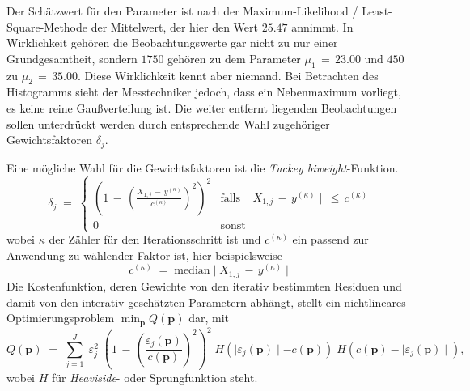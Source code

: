 Der Schätzwert für den Parameter ist nach der Maximum-Likelihood / Least-Square-Methode der
Mittelwert, der hier den Wert $25.47$ annimmt. In Wirklichkeit gehören die Beobachtungswerte gar nicht zu
nur einer Grundgesamtheit, sondern $1750$ gehören zu dem Parameter $\mu_1 \, = \, 23.00$ und $450$ zu $\mu_2 \, = \, 35.00$.
Diese Wirklichkeit kennt aber niemand. Bei Betrachten des Histogramms sieht der Messtechniker jedoch, dass ein
Nebenmaximum vorliegt, es keine reine Gaußverteilung ist. Die weiter entfernt liegenden Beobachtungen sollen unterdrückt werden
durch entsprechende Wahl zugehöriger Gewichtsfaktoren $\delta_j$.

Eine mögliche Wahl für die Gewichtsfaktoren ist die \textsl{Tuckey biweight}-Funktion.
\begin{equation}
\delta_j \; = \;
\left\{ \begin{array}{cl}
\left( 1 \, - \, \left( \frac{X_{1,j} \, - \, y^{(\kappa)}}{c^{(\kappa)}} \right)^2 \right)^2 & 
	\mathrm{falls} \; \mid X_{1,j} \, - \, y^{(\kappa)} \mid \, \leq \, c^{(\kappa)} \\
0 & \mathrm{sonst}
\end{array} \right.
\end{equation}
wobei $\kappa$ der Zähler für den Iterationsschritt ist und $c^{(\kappa)}$ ein passend zur Anwendung zu wählender Faktor ist, hier beispielsweise
\begin{equation}
c^{(\kappa)} \; = \; \mathrm{median} \mid X_{1,j} \, - \, y^{(\kappa)} \mid 
\end{equation}
Die Kostenfunktion, deren Gewichte von den iterativ bestimmten Residuen und damit von den
interativ geschätzten Parametern abhängt, stellt ein nichtlineares Optimierungsproblem
$ \min_{\mathbf{p}} Q(\mathbf{p}) $ dar, mit
\begin{equation}
Q(\mathbf{p}) \; = \; \sum_{j=1}^J \; \varepsilon_j^2 \;
\left( 1 \, - \, \left( \frac{\varepsilon_j(\mathbf{p}) }{c(\mathbf{p})} \right)^2 \right)^2 \;
H(\mid \varepsilon_j(\mathbf{p}) \mid - c(\mathbf{p})) \;
H(c(\mathbf{p}) - \mid \varepsilon_j(\mathbf{p}) \mid ),
\label{robustEstim2}
\end{equation}
wobei $H$ für \textsl{Heaviside}- oder Sprungfunktion steht.

